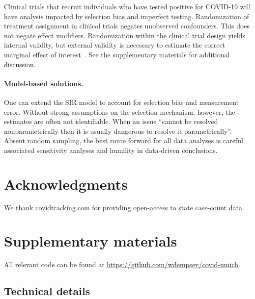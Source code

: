 \documentclass[12pt]{article}
\begin{document}
Clinical trials that recruit individuals who have tested positive for COVID-19 will have analysis impacted by selection bias and imperfect testing. Randomization of treatment assignment in clinical trials negates unobserved confounders.  This does not negate effect modifiers.  Randomization within the clinical trial design yields internal validity, but external validity is necessary to estimate the correct marginal effect of interest~\cite{Keiding2016}. See the supplementary materials for additional discussion.

\paragraph*{Model-based solutions.}

One can extend the SIR model to account for selection bias and measurement error. Without strong assumptions on the selection mechanism, however, the estimates are often not identifiable.  When an issue ``cannot be resolved nonparametrically then it is usually dangerous to resolve it parametrically''\cite{CoxHink74}. Absent random sampling, the best route forward for all data analyses is careful associated sensitivity analyses and humility in data-driven conclusions.

% 






\section*{Acknowledgments}
We thank covidtracking.com for providing open-access to state case-count data.


\section*{Supplementary materials}

All relevant code can be found at \url{https://github.com/wdempsey/covid-umich}.

\subsection*{Technical details}
\end{document}

